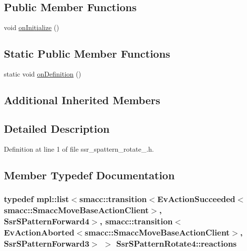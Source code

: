 \subsection*{Public Member Functions}
\begin{DoxyCompactItemize}
\item 
void \hyperlink{structSsrSPatternRotate4_aace2b26d4d2dc87438c14e0c625aeb05}{on\+Initialize} ()
\end{DoxyCompactItemize}
\subsection*{Static Public Member Functions}
\begin{DoxyCompactItemize}
\item 
static void \hyperlink{structSsrSPatternRotate4_ae63657dc25c546ffaafa01427c8f0dca}{on\+Definition} ()
\end{DoxyCompactItemize}
\subsection*{Additional Inherited Members}


\subsection{Detailed Description}


Definition at line 1 of file ssr\+\_\+spattern\+\_\+rotate\+\_.\+h.



\subsection{Member Typedef Documentation}
\subsubsection[{\texorpdfstring{reactions}{reactions}}]{\setlength{\rightskip}{0pt plus 5cm}typedef mpl\+::list$<${\bf smacc\+::transition}$<$Ev\+Action\+Succeeded$<${\bf smacc\+::\+Smacc\+Move\+Base\+Action\+Client}$>$, {\bf Ssr\+S\+Pattern\+Forward4}$>$, {\bf smacc\+::transition}$<$Ev\+Action\+Aborted$<${\bf smacc\+::\+Smacc\+Move\+Base\+Action\+Client}$>$, {\bf Ssr\+S\+Pattern\+Forward3}$>$ $>$ {\bf Ssr\+S\+Pattern\+Rotate4\+::reactions}}\hypertarget{structSsrSPatternRotate4_a876753525a2db93f305ce372622413a3}{}\label{structSsrSPatternRotate4_a876753525a2db93f305ce372622413a3}


